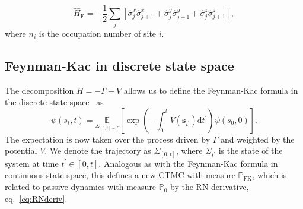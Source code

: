 \begin{equation}
\hat H_{\mathrm{F}}=-\frac{1}{2} \sum_{j}\left[\hat{\sigma}_{j}^{x} \hat{\sigma}_{j+1}^{x}+\hat{\sigma}_{j}^{y} \hat{\sigma}_{j+1}^{y}+\hat{\sigma}_{j}^{z} \hat{\sigma}_{j+1}^{z}\right],
\end{equation}
where $n_i$ is the occupation number of site $i$.
%

\subsection{Feynman-Kac in discrete state space}
The decomposition $H = -\Gamma + V$ allows us to define the Feynman-Kac formula in the discrete state space~\cite{rogers2000diffusions} as
\begin{equation}
	\label{eq:fkac_disc}
	\psi\left(s_t, t\right)=
	\underset{\Sigma_{[0, t] \sim \Gamma}}{\mathbb{E}}
	\left[
	\exp \left(-\int_{0}^{t} V\left(\boldsymbol{s}_{t^{\prime}}\right) \mathrm{d} t^{\prime}\right) \psi\left(s_0, 0\right)
	\right].
\end{equation}
The expectation is now taken over the process driven by $\Gamma$ and weighted by the potential $V$. We denote the trajectory as $\Sigma_{[0, t]}$, where $\Sigma_{t^\prime}$ is the state of the system at time $t^\prime \in [0, t]$. Analogous as with the Feynman-Kac formula in continuous state space, this defines a new CTMC with measure $\mathbb{P}_{\text{FK}}$, which is related to  passive dynamics with measure $\mathbb{P}_0$ by the RN derivative, eq.~\eqref{eq:RNderiv}.

